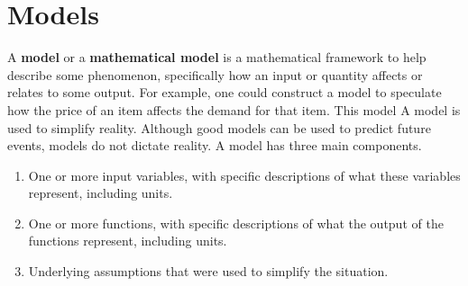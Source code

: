 \section{Models}
\label{sec:models}

A {\bf model}  or a {\bf mathematical model} is a mathematical framework to help describe some phenomenon, specifically how an input or quantity affects or relates to some output. For example, one could construct a model to speculate how the price of an item affects the demand for that item. This model A model is used to simplify reality. Although good models can be used to predict future events, models do not dictate reality. A model has three main components.
\begin{enumerate}
    \item One or more input variables, with specific descriptions of what these variables represent, including units.
    \item One or more functions, with specific descriptions of what the output of the functions represent, including units.
    \item Underlying assumptions that were used to simplify the situation.
\end{enumerate}
